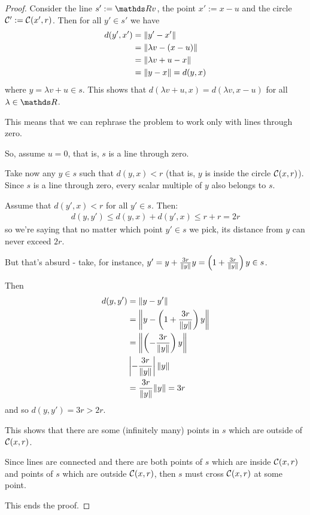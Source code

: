 \begin{proof}
	Consider the line $s':=\R v$, the point $x':=x-u$ and the circle $\mathcal C':=\mathcal C(x',r)$. Then for all $y'\in s'$ we have
	\begin{align*}
		d(y',x')&=\lVert y'-x'\rVert\\
		&=\lVert\lambda v-(x-u)\rVert\\
		&=\lVert\lambda v+u-x\rVert\\
		&=\lVert y-x\rVert=d(y,x)
	\end{align*}where $y=\lambda v+u\in s$. This shows that $d(\lambda v+u,x)=d(\lambda v,x-u)$ for all $\lambda\in \R$.
	
	This means that we can rephrase the problem to work only with lines through zero.
	
	So, assume $u=0$, that is, $s$ is a line through zero.
	
	Take now any $y\in s$ such that $d(y,x)<r$ (that is, $y$ is inside the circle $\mathcal C(x,r)$). Since $s$ is a line through zero, every scalar multiple of $y$ also belongs to $s$.
	
	Assume that $d(y',x)<r$ for all $y'\in s$. Then:
	\begin{align*}
		d(y,y')\leq d(y,x)+d(y',x)\leq r+r=2r
	\end{align*}so we're saying that no matter which point $y'\in s$ we pick, its distance from $y$ can never exceed $2r$.
	
	But that's absurd - take, for instance, $y'=y+\frac{3r}{\lVert y\rVert}y=\left(1+\frac{3r}{\lVert y\rVert}\right)y\in s$.
	
	Then
	\begin{align*}
		d(y,y')&=\lVert y-y'\rVert\\
		&=\left\Vert y-\left(1+\frac{3r}{\lVert y\rVert}\right)y\right\Vert\\
		&=\left\Vert\left(-\frac{3r}{\lVert y\rVert}\right)y\right\Vert\\
		&\left\vert-\frac{3r}{\lVert y\rVert}\right\vert\lVert y\rVert\\
		&=\frac{3r}{\lVert y\rVert}\lVert y\rVert=3r
	\end{align*}and so $d(y,y')=3r>2r$.
	
	This shows that there are some (infinitely many) points in $s$ which are outside of $\mathcal C(x,r)$.
	
	Since lines are connected and there are both points of $s$ which are inside $\mathcal C(x,r)$ and points of $s$ which are outside $\mathcal C(x,r)$, then $s$ must cross $\mathcal C(x,r)$ at some point.
	
	This ends the proof.
\end{proof}

